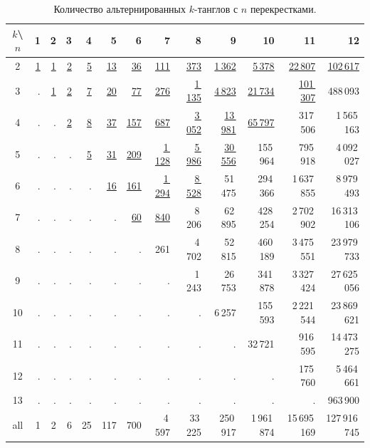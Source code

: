 \documentclass[12pt]{article}
\theoremstyle{plain}
\theoremstyle{definition}
\begin{document}
		\begin{table}[ht]
			\caption{Количество альтернированных $k$-танглов с $n$ перекрестками.\label{table:alternating-tangles-table}}
			\centering
			{\footnotesize
			\let\ul=\underline
			\begin{tabular}{|c||r|r|r|r|r|r|r|r|r|r|r|r|}
			\hline
			$k$\textbackslash $n$
			    &      1 &      2 &      3 &      4 &       5 &        6 &           7 &           8 &            9 &           10 &            11 &            12 \\
			\hline\hline
			2   & \ul{1} & \ul{1} & \ul{2} & \ul{5} & \ul{13} &  \ul{36} &    \ul{111} &    \ul{373} &  \ul{1\,362} &  \ul{5\,378} &  \ul{22\,807} & \ul{102\,617} \\
			3   &      . & \ul{1} & \ul{2} & \ul{7} & \ul{20} &  \ul{77} &    \ul{276} & \ul{1\,135} &  \ul{4\,823} & \ul{21\,734} & \ul{101\,307} &      488\,093 \\
			4   &      . &      . & \ul{2} & \ul{8} & \ul{37} & \ul{157} &    \ul{687} & \ul{3\,052} & \ul{13\,981} & \ul{65\,797} &      317\,506 &   1\,565\,163 \\
			5   &      . &      . &      . & \ul{5} & \ul{31} & \ul{209} & \ul{1\,128} & \ul{5\,986} & \ul{30\,556} &     155\,964 &      795\,918 &   4\,092\,027 \\
			6   &      . &      . &      . &      . & \ul{16} & \ul{161} & \ul{1\,294} & \ul{8\,528} &      51\,475 &     294\,366 &   1\,637\,855 &   8\,979\,493 \\
			7   &      . &      . &      . &      . &       . &  \ul{60} &    \ul{840} &      8\,206 &      62\,895 &     428\,254 &   2\,702\,902 &  16\,313\,106 \\
			8   &      . &      . &      . &      . &       . &        . &         261 &      4\,702 &      52\,815 &     460\,189 &   3\,475\,551 &  23\,979\,733 \\
			9   &      . &      . &      . &      . &       . &        . &           . &      1\,243 &      26\,753 &     341\,878 &   3\,327\,424 &  27\,625\,056 \\
			10  &      . &      . &      . &      . &       . &        . &           . &           . &       6\,257 &     155\,593 &   2\,221\,544 &  23\,869\,621 \\
			11  &      . &      . &      . &      . &       . &        . &           . &           . &            . &      32\,721 &      916\,595 &  14\,473\,275 \\
			12  &      . &      . &      . &      . &       . &        . &           . &           . &            . &            . &      175\,760 &   5\,464\,661 \\
			13  &      . &      . &      . &      . &       . &        . &           . &           . &            . &            . &             . &      963\,900 \\
			\hline
			all &      1 &      2 &      6 &     25 &     117 &      700 &      4\,597 &     33\,225 &     250\,917 &  1\,961\,874 &  15\,695\,169 & 127\,916\,745 \\
			\hline
			\end{tabular}
			}
		\end{table}
\end{document}
